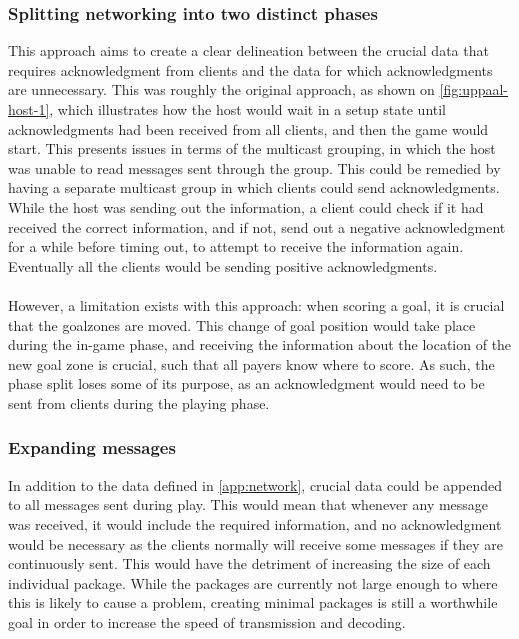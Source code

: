 \subsubsection{Splitting networking into two distinct phases}
This approach aims to create a clear delineation between the crucial data that requires acknowledgment from clients and the data for which acknowledgments are unnecessary.
This was roughly the original approach, as shown on \autoref{fig:uppaal-host-1}, which illustrates how the host would wait in a setup state until acknowledgments had been received from all clients, and then the game would start.
This presents issues in terms of the multicast grouping, in which the host was unable to read messages sent through the group.
This could be remedied by having a separate multicast group in which clients could send acknowledgments.
While the host was sending out the information, a client could check if it had received the correct information, and if not, send out a negative acknowledgment for a while before timing out, to attempt to receive the information again.
Eventually all the clients would be sending positive acknowledgments.
\\\\
However, a limitation exists with this approach: when scoring a goal, it is crucial that the goalzones are moved.
This change of goal position would take place during the in-game phase, and receiving the information about the location of the new goal zone is crucial, such that all payers know where to score.
As such, the phase split loses some of its purpose, as an acknowledgment would need to be sent from clients during the playing phase.

\subsubsection{Expanding messages}
In addition to the data defined in \autoref{app:network}, crucial data could be appended to all messages sent during play.
This would mean that whenever any message was received, it would include the required information, and no acknowledgment would be necessary as the clients normally will receive some messages if they are continuously sent.
This would have the detriment of increasing the size of each individual package.
While the packages are currently not large enough to where this is likely to cause a problem, creating minimal packages is still a worthwhile goal in order to increase the speed of transmission and decoding.

